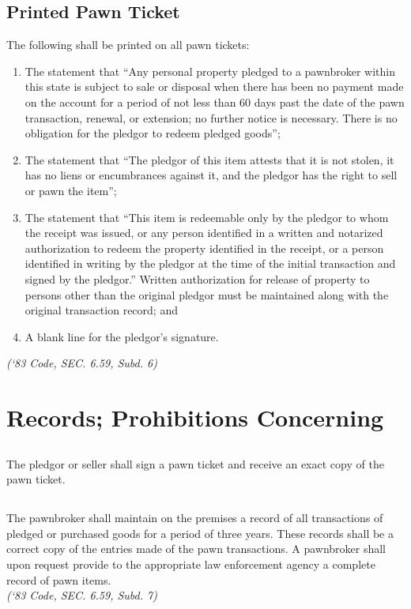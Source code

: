 \subsection{Printed Pawn Ticket}
The following shall be printed on all pawn tickets:
\begin{enumerate}[{\indent}1)]
    \item The statement that “Any personal property pledged to a pawnbroker within this state is subject to sale or disposal when there has been no payment made on the account for a period of not less than 60 days past the date of the pawn transaction, renewal, or extension; no further notice is necessary.  There is no obligation for the pledgor to redeem pledged goods”;
    \item The statement that “The pledgor of this item attests that it is not stolen, it has no liens or encumbrances against it, and the pledgor has the right to sell or pawn the item”;
    \item The statement that “This item is redeemable only by the pledgor to whom the receipt was issued, or any person identified in a written and notarized authorization to redeem the property identified in the receipt, or a person identified in writing by the pledgor at the time of the initial transaction and signed by the pledgor.” Written authorization for release of property to persons other than the original pledgor must be maintained along with the original transaction record; and
    \item A blank line for the pledgor’s signature.
\end{enumerate}
\emph{(‘83 Code, SEC. 6.59, Subd. 6)}
\section{Records; Prohibitions Concerning}
\subsection{}
The pledgor or seller shall sign a pawn ticket and receive an exact copy of the pawn ticket.
\subsection{}
The pawnbroker shall maintain on the premises a record of all transactions of pledged or purchased goods for a period of three years.  These records shall be a correct copy of the entries made of the pawn transactions.  A pawnbroker shall upon request provide to the appropriate law enforcement agency a complete record of pawn items.\\
\emph{(‘83 Code, SEC. 6.59, Subd. 7)}

